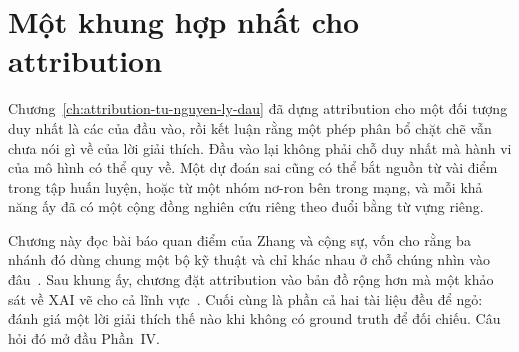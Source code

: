 \chapter{Một khung hợp nhất cho attribution}
\label{ch:khung-hop-nhat}

Chương~\ref{ch:attribution-tu-nguyen-ly-dau} đã dựng attribution cho một đối
tượng duy nhất là các  của đầu vào, rồi kết luận rằng một
phép phân bổ chặt chẽ vẫn chưa nói gì về  của
lời giải thích. Đầu vào lại không phải chỗ duy nhất mà hành vi của mô hình có
thể quy về. Một dự đoán sai cũng có thể bắt nguồn từ vài điểm trong tập huấn
luyện, hoặc từ một nhóm nơ-ron bên trong mạng, và mỗi khả năng ấy đã có một
cộng đồng nghiên cứu riêng theo đuổi bằng từ vựng riêng.

Chương này đọc bài báo quan điểm của Zhang và cộng sự, vốn cho rằng ba nhánh đó
dùng chung một bộ kỹ thuật và chỉ khác nhau ở chỗ chúng nhìn vào
đâu~\autocite{p18unified}. Sau khung ấy, chương đặt attribution vào bản đồ rộng
hơn mà một khảo sát về XAI vẽ cho cả lĩnh vực~\autocite{p20trends}. Cuối cùng là
phần cả hai tài liệu đều để ngỏ: đánh giá một lời giải thích thế nào khi không
có ground truth để đối chiếu. Câu hỏi đó mở đầu Phần~IV.









